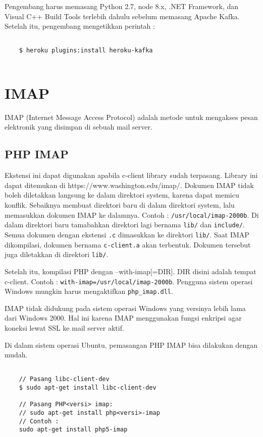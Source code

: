 Pengembang harus memasang Python 2.7, node 8.x, .NET Framework, dan Visual C++ Build Tools terlebih dahulu sebelum memasang Apache Kafka. Setelah itu, pengembang mengetikkan perintah :
\begin{lstlisting}
	
	$ heroku plugins:install heroku-kafka
	
\end{lstlisting}

\section{IMAP}
\label{sec:IMAP}
IMAP (Internet Message Access Protocol) adalah metode untuk mengakses pesan elektronik yang disimpan di sebuah mail server.
\subsection{PHP IMAP}
Ekstensi ini dapat digunakan apabila c-client library sudah terpasang. Library ini dapat ditemukan di https://www.washington.edu/imap/. Dokumen IMAP tidak boleh diletakkan langsung ke dalam direktori system, karena dapat memicu konflik. Sebaiknya membuat direktori baru di dalam direktori system, lalu memasukkan dokumen IMAP ke dalamnya. Contoh : \texttt{/usr/local/imap-2000b}. Di dalam direktori baru tamabahkan direktori lagi bernama \texttt{lib/} dan \texttt{include/}. Semua dokumen dengan ekstensi \texttt{.c} dimasukkan ke direktori \texttt{lib/}. Saat IMAP dikompilasi, dokumen bernama \texttt{c-client.a} akan terbentuk. Dokumen tersebut juga diletakkan di direktori \texttt{lib/}.

Setelah itu, kompilasi PHP dengan --with-imap[=DIR]. DIR disini adalah tempat c-client. Contoh : \texttt{with-imap=/usr/local/imap-2000b}. Pengguna sistem operasi Windows mungkin harus mengaktifkan \texttt{php\_imap.dll}.

IMAP tidak didukung pada sistem operasi Windows yang versinya lebih lama dari Windows 2000. Hal ini karena IMAP menggunakan fungsi enkripsi agar koneksi lewat SSL ke mail server aktif.

Di dalam sistem operasi Ubuntu, pemasangan PHP IMAP bisa dilakukan dengan mudah.
\begin{lstlisting}
	
	// Pasang libc-client-dev
	$ sudo apt-get install libc-client-dev

	// Pasang PHP<versi> imap:
	// sudo apt-get install php<versi>-imap
	// Contoh : 
	sudo apt-get install php5-imap
		
\end{lstlisting}


